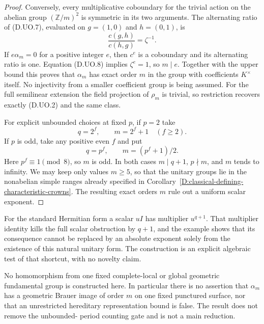 \begin{proof}
Conversely, every multiplicative coboundary for
the trivial action on the abelian group
$(\mathbb Z/m)^2$ is symmetric in its two arguments.
The alternating ratio of (D.UO.7), evaluated on
$g=(1,0)$ and $h=(0,1)$, is
\[
                   \frac{c(g,h)}{c(h,g)}=\zeta^{-1}.
                                                               \tag{D.UO.8}
\]
If $e\alpha_m=0$ for a positive integer $e$,
then $c^e$ is a coboundary and its alternating
ratio is one. Equation (D.UO.8) implies
$\zeta^e=1$, so $m\mid e$.
Together with the upper bound this proves that
$\alpha_m$ has exact order $m$ in the group with
coefficients $K^\times$ itself. No injectivity
from a smaller coefficient group is being assumed.
For the full semilinear extension the field
projection of $\rho_m$ is trivial, so restriction
recovers exactly (D.UO.2) and the same class.

For explicit unbounded choices at fixed $p$, if
$p=2$ take
\[
                       q=2^f,\qquad m=2^f+1
                       \quad(f\ge2).
                                                               \tag{D.UO.9}
\]
If $p$ is odd, take any positive even $f$ and put
\[
                       q=p^f,\qquad m=(p^f+1)/2.
                                                               \tag{D.UO.10}
\]
Here $p^f\equiv1\pmod8$, so $m$ is odd.
In both cases $m\mid q+1$, $p\nmid m$, and
$m$ tends to infinity. We may keep only values
$m\ge5$, so that the unitary groups lie in the
nonabelian simple ranges already specified in
Corollary~\ref{D:classical-defining-characteristic-crowns}.
The resulting exact orders $m$ rule out a uniform
scalar exponent.
\end{proof}

\begin{remark}
For the standard Hermitian form a scalar $uI$ has
multiplier $u^{q+1}$. That multiplier identity kills
the full scalar obstruction by $q+1$, and the
example shows that its consequence cannot be
replaced by an absolute exponent solely from the
existence of this natural unitary form.
The construction is an explicit algebraic test of
that shortcut, with no novelty claim.

No homomorphism from one fixed complete-local or
global geometric fundamental group is constructed
here. In particular there is no assertion that
$\alpha_m$ has a geometric Brauer image of order
$m$ on one fixed punctured surface, nor that an
unrestricted hereditary representation bound is
false. The result does not remove the unbounded-
period counting gate and is not a main reduction.
\end{remark}

